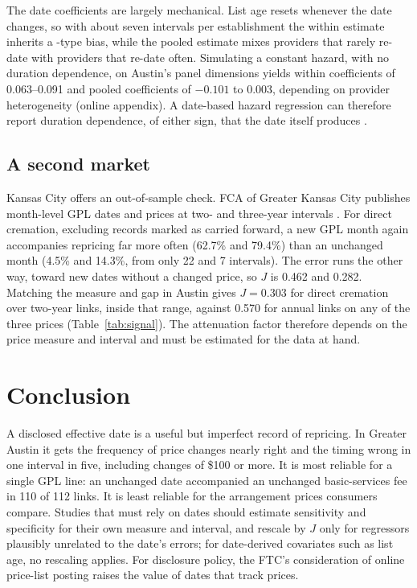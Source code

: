 \documentclass[preprint,12pt,authoryear]{elsarticle}
\begin{document}
The date coefficients are largely mechanical. List age resets whenever the date changes, so with about seven intervals per establishment the within estimate inherits a \citet{nickell_1981}-type bias, while the pooled estimate mixes providers that rarely re-date with providers that re-date often. Simulating a constant hazard, with no duration dependence, on Austin's panel dimensions yields within coefficients of 0.063--0.091 and pooled coefficients of $-0.101$ to 0.003, depending on provider heterogeneity (online appendix). A date-based hazard regression can therefore report duration dependence, of either sign, that the date itself produces \citep[cf.][]{alvarez_borovickova_shimer_2025}.

\subsection{A second market}
Kansas City offers an out-of-sample check. FCA of Greater Kansas City publishes month-level GPL dates and prices at two- and three-year intervals \citep{fcagkc2018,fcagkc2020,fcagkc2023}. For direct cremation, excluding records marked as carried forward, a new GPL month again accompanies repricing far more often (62.7\% and 79.4\%) than an unchanged month (4.5\% and 14.3\%, from only 22 and 7 intervals). The error runs the other way, toward new dates without a changed price, so $J$ is 0.462 and 0.282. Matching the measure and gap in Austin gives $J=0.303$ for direct cremation over two-year links, inside that range, against 0.570 for annual links on any of the three prices (Table~\ref{tab:signal}).
The attenuation factor therefore depends on the price measure and interval and must be estimated for the data at hand.

\section{Conclusion}
A disclosed effective date is a useful but imperfect record of repricing. In Greater Austin it gets the frequency of price changes nearly right and the timing wrong in one interval in five, including changes of \$100 or more. It is most reliable for a single GPL line: an unchanged date accompanied an unchanged basic-services fee in 110 of 112 links. It is least reliable for the arrangement prices consumers compare. Studies that must rely on dates should estimate sensitivity and specificity for their own measure and interval, and rescale by $J$ only for regressors plausibly unrelated to the date's errors; for date-derived covariates such as list age, no rescaling applies. For disclosure policy, the FTC's consideration of online price-list posting \citep{ftc_anpr_2022} raises the value of dates that track prices.
\end{document}
